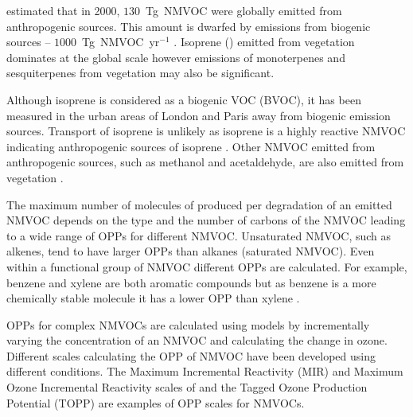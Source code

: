 \citet{Lamarque:2010} estimated that in 2000, $130$~Tg~NMVOC were globally emitted from anthropogenic sources.
This amount is dwarfed by emissions from biogenic sources -- $1000$~Tg~NMVOC~yr$^{-1}$ \citep{Guenther:2012}.
Isoprene () emitted from vegetation dominates at the global scale however emissions of monoterpenes and sesquiterpenes from vegetation may also be significant.

Although isoprene is considered as a biogenic VOC (BVOC), it has been measured in the urban areas of London and Paris away from biogenic emission sources.
Transport of isoprene is unlikely as isoprene is a highly reactive NMVOC indicating anthropogenic sources of isoprene \citep{vonSchneidemesser:2011}.
Other NMVOC emitted from anthropogenic sources, such as methanol and acetaldehyde, are also emitted from vegetation \citep{Guenther:2012}.

The maximum number of molecules of  produced per degradation of an emitted NMVOC depends on the type and the number of carbons of the NMVOC leading to a wide range of OPPs for different NMVOC.
Unsaturated NMVOC, such as alkenes, tend to have larger OPPs than alkanes (saturated NMVOC).
Even within a functional group of NMVOC different OPPs are calculated.
For example, benzene and xylene are both aromatic compounds but as benzene is a more chemically stable molecule it has a lower OPP than xylene \citep{Carter:1994}.

OPPs for complex NMVOCs are calculated using models by incrementally varying the concentration of an NMVOC and calculating the change in ozone.
Different scales calculating the OPP of NMVOC have been developed using different  conditions.
The Maximum Incremental Reactivity (MIR) and Maximum Ozone Incremental Reactivity scales of \citet{Carter:1994} and the Tagged Ozone Production Potential (TOPP) are examples of OPP scales for NMVOCs.

